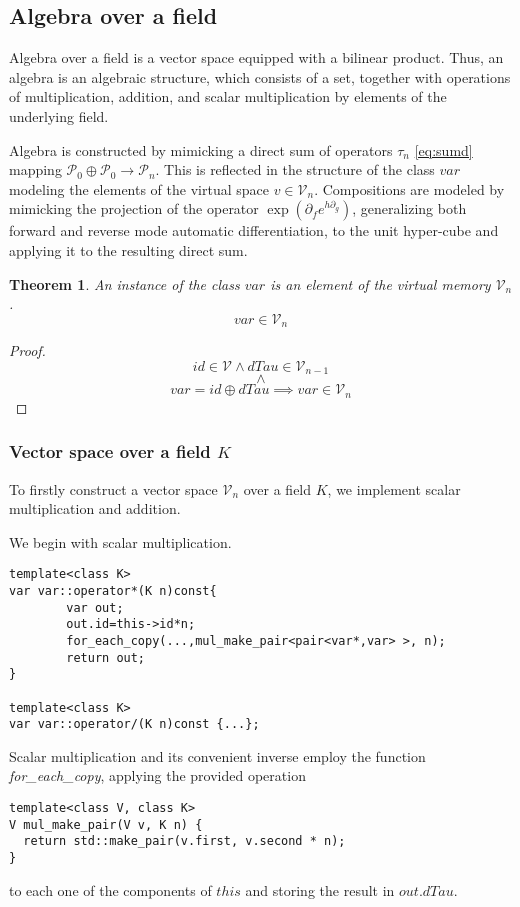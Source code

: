 \documentclass{article}
\newcommand{\VV}{\mathcal{V}}
\newcommand{\dP}{\mathcal{P}}
\newcommand{\D}{\partial}
\newcommand{\sumd}{\tau}
\newtheorem{izrek}{Theorem}[section]
\begin{document}
\subsection{Algebra over a field}\label{sec:Algebra}

 Algebra over a field is a vector space equipped with a bilinear product. Thus, an algebra is an algebraic structure, which consists of a set, together with operations of multiplication, addition, and scalar multiplication by elements of the underlying field.
 
 Algebra is constructed by mimicking a direct sum of operators $\sumd_n$ \eqref{eq:sumd} mapping $\dP_0\oplus\dP_0\to\dP_n$. This is reflected in the structure of the class $var$  modeling the elements of the virtual space $v\in\VV_n$. Compositions are modeled by mimicking the projection of the operator $\exp(\D_fe^{h\D_g})$, generalizing both forward and reverse mode automatic differentiation, to the unit hyper-cube and applying it to the resulting direct sum.
 
\begin{izrek}
An instance of the class $var$ is an element of the virtual memory $\VV_n$.
 \begin{equation}
 var\in\VV_n
 \end{equation}
\end{izrek}
\begin{proof}
\begin{equation}
 id\in \VV\land  dTau\in \VV_{n-1}
 \end{equation}
 $$\land$$
 \begin{equation}
 var=id\oplus dTau\implies var\in\VV_n
 \end{equation}
\end{proof}

\subsubsection{Vector space over a field $K$}
 
To firstly construct a vector space $\VV_n$ over a field $K$, we implement scalar multiplication and addition. 

We begin with scalar multiplication.

\begin{lstlisting}
template<class K>
var var::operator*(K n)const{
		var out;
        out.id=this->id*n;
        for_each_copy(...,mul_make_pair<pair<var*,var> >, n);
        return out;
}

template<class K>
var var::operator/(K n)const {...};
\end{lstlisting}
Scalar multiplication and its convenient inverse employ the function \emph{for\_each\_copy}, applying the provided operation 
\begin{lstlisting}
template<class V, class K>
V mul_make_pair(V v, K n) {
  return std::make_pair(v.first, v.second * n);
}
\end{lstlisting}
to each one of the components of $this$ and storing the result in $out.dTau$.
\end{document}
